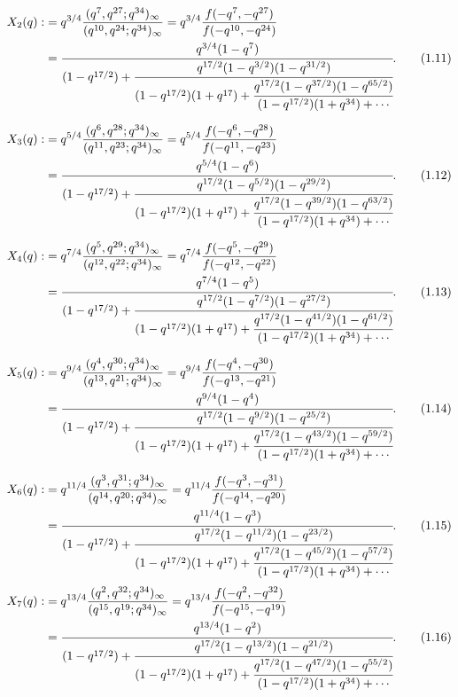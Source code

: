 \documentclass[11pt,a4paper]{article}
\numberwithin{equation}{section}
\theoremstyle{plain}
\begin{document}
	\begin{align}
		X_2(q) :&= q^{3/4}\frac{(q^{7},q^{27};q^{34})_{\infty}}{(q^{10},q^{24};q^{34})_{\infty}}
		= q^{3/4}\frac{f(-q^{7},-q^{27})}{f(-q^{10},-q^{24})}  \notag\\
		&=
		\cfrac{q^{3/4}(1-q^{7})}
		{(1-q^{17/2})
			+\cfrac{q^{17/2}(1-q^{3/2})(1-q^{31/2})}
			{(1-q^{17/2})(1+q^{17})
				+\cfrac{q^{17/2}(1-q^{37/2})(1-q^{65/2})}
				{(1-q^{17/2})(1+q^{34})+\cdots}}}.
		\tag{1.11}
	\end{align}
	
	\begin{align}
		X_3(q) :&= q^{5/4}\frac{(q^{6},q^{28};q^{34})_{\infty}}{(q^{11},q^{23};q^{34})_{\infty}}
		= q^{5/4}\frac{f(-q^{6},-q^{28})}{f(-q^{11},-q^{23})}  \notag\\
		&=
		\cfrac{q^{5/4}(1-q^{6})}
		{(1-q^{17/2})
			+\cfrac{q^{17/2}(1-q^{5/2})(1-q^{29/2})}
			{(1-q^{17/2})(1+q^{17})
				+\cfrac{q^{17/2}(1-q^{39/2})(1-q^{63/2})}
				{(1-q^{17/2})(1+q^{34})+\cdots}}}.
		\tag{1.12}
	\end{align}
	
	\begin{align}
		X_4(q) :&= q^{7/4}\frac{(q^{5},q^{29};q^{34})_{\infty}}{(q^{12},q^{22};q^{34})_{\infty}}
		= q^{7/4}\frac{f(-q^{5},-q^{29})}{f(-q^{12},-q^{22})}  \notag\\
		&=
		\cfrac{q^{7/4}(1-q^{5})}
		{(1-q^{17/2})
			+\cfrac{q^{17/2}(1-q^{7/2})(1-q^{27/2})}
			{(1-q^{17/2})(1+q^{17})
				+\cfrac{q^{17/2}(1-q^{41/2})(1-q^{61/2})}
				{(1-q^{17/2})(1+q^{34})+\cdots}}}.
		\tag{1.13}
	\end{align}
	
	\begin{align}
		X_5(q) :&= q^{9/4}\frac{(q^{4},q^{30};q^{34})_{\infty}}{(q^{13},q^{21};q^{34})_{\infty}}
		= q^{9/4}\frac{f(-q^{4},-q^{30})}{f(-q^{13},-q^{21})}  \notag\\
		&=
		\cfrac{q^{9/4}(1-q^{4})}
		{(1-q^{17/2})
			+\cfrac{q^{17/2}(1-q^{9/2})(1-q^{25/2})}
			{(1-q^{17/2})(1+q^{17})
				+\cfrac{q^{17/2}(1-q^{43/2})(1-q^{59/2})}
				{(1-q^{17/2})(1+q^{34})+\cdots}}}.
		\tag{1.14}
	\end{align}
	
	\begin{align}
		X_6(q) :&= q^{11/4}\frac{(q^{3},q^{31};q^{34})_{\infty}}{(q^{14},q^{20};q^{34})_{\infty}}
		= q^{11/4}\frac{f(-q^{3},-q^{31})}{f(-q^{14},-q^{20})}  \notag\\
		&=
		\cfrac{q^{11/4}(1-q^{3})}
		{(1-q^{17/2})
			+\cfrac{q^{17/2}(1-q^{11/2})(1-q^{23/2})}
			{(1-q^{17/2})(1+q^{17})
				+\cfrac{q^{17/2}(1-q^{45/2})(1-q^{57/2})}
				{(1-q^{17/2})(1+q^{34})+\cdots}}}.
		\tag{1.15}
	\end{align}
	\begin{align}
		X_7(q) :&= q^{13/4}\frac{(q^{2},q^{32};q^{34})_{\infty}}{(q^{15},q^{19};q^{34})_{\infty}}
		= q^{13/4}\frac{f(-q^{2},-q^{32})}{f(-q^{15},-q^{19})}  \notag\\
		&=
		\cfrac{q^{13/4}(1-q^{2})}
		{(1-q^{17/2})
			+\cfrac{q^{17/2}(1-q^{13/2})(1-q^{21/2})}
			{(1-q^{17/2})(1+q^{17})
				+\cfrac{q^{17/2}(1-q^{47/2})(1-q^{55/2})}
				{(1-q^{17/2})(1+q^{34})+\cdots}}}.
		\tag{1.16}
	\end{align}
	
\end{document}
